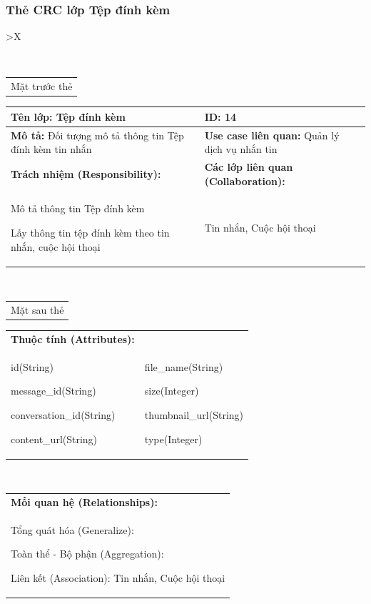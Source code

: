   \subsubsection{Thẻ CRC lớp Tệp đính kèm}
  \begin{xltabular}{\textwidth}{
    >{\centering\arraybackslash}X 
  }
  \caption{\bfseries \fontsize{12pt}{0pt}\selectfont Thẻ CRC lớp Tệp đính kèm}
  \\
  \begin{tabularx}{0.9\textwidth}{X}
    Mặt trước thẻ
  \end{tabularx}
  \begin{tabularx}{0.9\textwidth}{|X|X|}
    \hline
    \textbf{Tên lớp:} Tệp đính kèm & \textbf{ID:} 14 \\
    \hline
    \textbf{Mô tả:} Đối tượng mô tả thông tin Tệp đính kèm tin nhắn & \textbf{Use case liên quan:} Quản lý dịch vụ nhắn tin \\
    \hline
    \textbf{Trách nhiệm (Responsibility):} & \textbf{Các lớp liên quan (Collaboration):} \\
    Mô tả thông tin Tệp đính kèm

    Lấy thông tin tệp đính kèm theo tin nhắn, cuộc hội thoại
    & 
    Tin nhắn, Cuộc hội thoại
    \\
    \hline
  \end{tabularx}
  \\ 
  \begin{tabularx}{0.9\textwidth}{X}
    Mặt sau thẻ
  \end{tabularx} 
  \begin{tabularx}{0.9\textwidth}{|X|X|}
    \hline
    \textbf{Thuộc tính (Attributes):} & \\
    id(String) 
    
    message\_id(String)

    conversation\_id(String)

    content\_url(String)
    &
    file\_name(String)

    size(Integer)

    thumbnail\_url(String)

    type(Integer)
    \\
    \hline
  \end{tabularx}
  \\     
  \begin{tabularx}{0.9\textwidth}{|X|}
    \textbf{Mối quan hệ (Relationships):} \\
    Tổng quát hóa (Generalize):  

    Toàn thể - Bộ phận (Aggregation): 
    
    Liên kết (Association): Tin nhắn, Cuộc hội thoại 
    \\
    \hline
  \end{tabularx}
  \end{xltabular}


